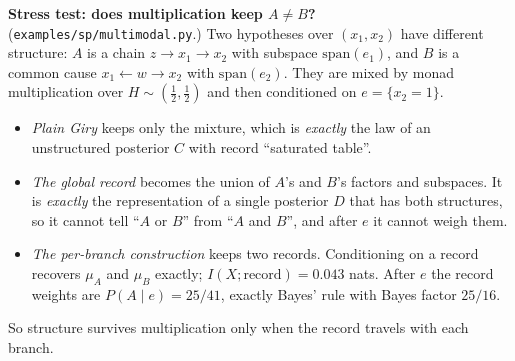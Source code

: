 \documentclass[11pt]{article}
\theoremstyle{definition}
\theoremstyle{remark}
\begin{document}
\textbf{Stress test: does multiplication keep $A\neq B$?} (\texttt{examples/sp/multimodal.py}.) Two hypotheses over $(x_1,x_2)$ have different structure: $A$ is a chain $z\to x_1\to x_2$ with subspace $\mathrm{span}(e_1)$, and $B$ is a common cause $x_1\leftarrow w\to x_2$ with $\mathrm{span}(e_2)$. They are mixed by monad multiplication over $H\sim(\tfrac12,\tfrac12)$ and then conditioned on $e=\{x_2=1\}$.
\begin{itemize}
  \item \emph{Plain Giry} keeps only the mixture, which is \emph{exactly} the law of an unstructured posterior $C$ with record ``saturated table''.
  \item \emph{The global record} becomes the union of $A$'s and $B$'s factors and subspaces. It is \emph{exactly} the representation of a single posterior $D$ that has both structures, so it cannot tell ``$A$ or $B$'' from ``$A$ and $B$'', and after $e$ it cannot weigh them.
  \item \emph{The per-branch construction} keeps two records. Conditioning on a record recovers $\mu_A$ and $\mu_B$ exactly; $I(X;\text{record})=0.043$ nats. After $e$ the record weights are $P(A\mid e)=25/41$, exactly Bayes' rule with Bayes factor $25/16$.
\end{itemize}
So structure survives multiplication only when the record travels with each branch.
\end{document}

